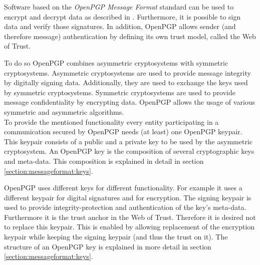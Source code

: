 Software based on the \textit{OpenPGP Message Format} standard can be used to encrypt and decrypt data as described in \cite[section 2]{RFC4880}. Furthermore, it is possible to sign data and verify those signatures. In addition, OpenPGP allows sender (and therefore message) authentication by defining its own trust model, called the Web of Trust. 

To do so OpenPGP combines asymmetric cryptosystems with symmetric cryptosystems. Asymmetric cryptosystems are used to provide message integrity by digitally signing data. Additionally, they are used to exchange the keys used by symmetric cryptosystems. Symmetric cryptosystems are used to provide message confidentiality by encrypting data. OpenPGP allows the usage of various symmetric and asymmetric algorithms. \\



To provide the mentioned functionality every entity participating in a communication secured by OpenPGP needs (at least) one OpenPGP keypair. This keypair consists of a public and a private key to be used by the asymmetric cryptosystem. An OpenPGP key is the composition of several cryptographic keys and meta-data. This composition is explained in detail in section \ref{section:messageformat:keys}. 


OpenPGP uses different keys for different functionality. For example it uses a different keypair for digital signatures and for encryption. The signing keypair is used to provide integrity-protection and authentication of the key's meta-data. Furthermore it is the trust anchor in the Web of Trust. Therefore it is desired not to replace this keypair. This is enabled by allowing replacement of the encryption keypair while keeping the signing keypair (and thus the trust on it). The structure of an OpenPGP key is explained in more detail in section \ref{section:messageformat:keys}. \\


